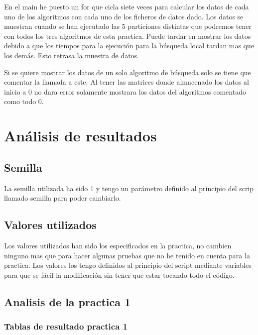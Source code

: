 \documentclass[titlepage]{article}
\begin{document}
	En el main he puesto un for que cicla siete veces para calcular los datos de cada uno de los algoritmos con cada uno de los ficheros de datos dado. Los datos se muestran cuando se han ejecutado las 5 particiones distintas que podremos tener con todos los tres algoritmos de esta practica. Puede tardar en mostrar los datos debido a que los tiempos para la ejecución para la búsqueda local tardan mas que los demás. Esto retrasa la muestra de datos.
	
	Si se quiere mostrar los datos de un solo algoritmo de búsqueda solo se tiene que comentar la llamada a este. Al tener las matrices donde almacenado los datos al inicio a 0 no dara error solamente mostrara los datos del algoritmos comentado como todo 0.
	\section{Análisis de resultados}
	\subsection{Semilla}
	La semilla utilizada ha sido 1 y tengo un parámetro definido al principio del scrip llamado semilla para poder cambiarlo.
	
	\subsection{Valores utilizados}	
	Los valores utilizados han sido los especificados en la practica, no cambien ninguno mas que para hacer algunas pruebas que no he tenido en cuenta para la practica. Los valores los tengo definidos al principio del script mediante variables para que se fácil la modificación sin tener que estar tocando todo el código.
	\newpage
	\subsection{Analisis de la practica 1}
	\subsubsection{Tablas de resultado practica 1}
	
\end{document}
